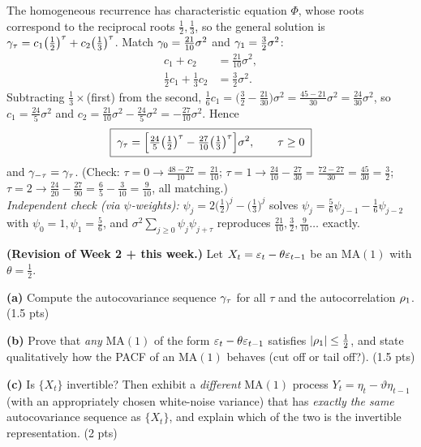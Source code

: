 \documentclass[11pt]{article}
\begin{document}
The homogeneous recurrence has characteristic equation $\Phi$, whose roots correspond to the reciprocal roots $\tfrac12,\tfrac13$, so the general solution is $\gamma_\tau=c_1\big(\tfrac12\big)^{\tau}+c_2\big(\tfrac13\big)^{\tau}$. Match $\gamma_0=\tfrac{21}{10}\sigma^2$ and $\gamma_1=\tfrac32\sigma^2$:
\[
\begin{aligned}
c_1+c_2&=\tfrac{21}{10}\sigma^2,\\
\tfrac12 c_1+\tfrac13 c_2&=\tfrac32\sigma^2 .
\end{aligned}
\]
Subtracting $\tfrac13\times$(first) from the second, $\tfrac16 c_1=\big(\tfrac32-\tfrac{21}{30}\big)\sigma^2=\tfrac{45-21}{30}\sigma^2=\tfrac{24}{30}\sigma^2$, so $c_1=\tfrac{24}{5}\sigma^2$ and $c_2=\tfrac{21}{10}\sigma^2-\tfrac{24}{5}\sigma^2=-\tfrac{27}{10}\sigma^2$. Hence
\[
\boxed{\;\gamma_\tau=\Big[\tfrac{24}{5}\big(\tfrac12\big)^{\tau}-\tfrac{27}{10}\big(\tfrac13\big)^{\tau}\Big]\sigma^2,\qquad \tau\ge0\;}
\]
and $\gamma_{-\tau}=\gamma_\tau$. (Check: $\tau=0\to\tfrac{48-27}{10}=\tfrac{21}{10}$; $\tau=1\to\tfrac{24}{10}-\tfrac{27}{30}=\tfrac{72-27}{30}=\tfrac{45}{30}=\tfrac32$; $\tau=2\to\tfrac{24}{20}-\tfrac{27}{90}=\tfrac{6}{5}-\tfrac{3}{10}=\tfrac{9}{10}$, all matching.)\\
\textit{Independent check (via $\psi$-weights):} $\psi_j=2\big(\tfrac12\big)^j-\big(\tfrac13\big)^j$ solves $\psi_j=\tfrac56\psi_{j-1}-\tfrac16\psi_{j-2}$ with $\psi_0=1,\psi_1=\tfrac56$, and $\sigma^2\sum_{j\ge0}\psi_j\psi_{j+\tau}$ reproduces $\tfrac{21}{10},\tfrac32,\tfrac9{10}\dots$ exactly.

\statementstart
\textbf{(Revision of Week 2 + this week.)} Let $X_t=\varepsilon_t-\theta\varepsilon_{t-1}$ be an $\mathrm{MA}(1)$ with $\theta=\tfrac12$.

\textbf{(a)} Compute the autocovariance sequence $\gamma_\tau$ for all $\tau$ and the autocorrelation $\rho_1$. \hfill(1.5 pts)

\textbf{(b)} Prove that \emph{any} $\mathrm{MA}(1)$ of the form $\varepsilon_t-\theta\varepsilon_{t-1}$ satisfies $\left\lvert \rho_1 \right\rvert\le\tfrac12$, and state qualitatively how the PACF of an $\mathrm{MA}(1)$ behaves (cut off or tail off?). \hfill(1.5 pts)

\textbf{(c)} Is $\{X_t\}$ invertible? Then exhibit a \emph{different} $\mathrm{MA}(1)$ process $Y_t=\eta_t-\vartheta\eta_{t-1}$ (with an appropriately chosen white-noise variance) that has \emph{exactly the same} autocovariance sequence as $\{X_t\}$, and explain which of the two is the invertible representation. \hfill(2 pts)
\statementend
\end{document}
